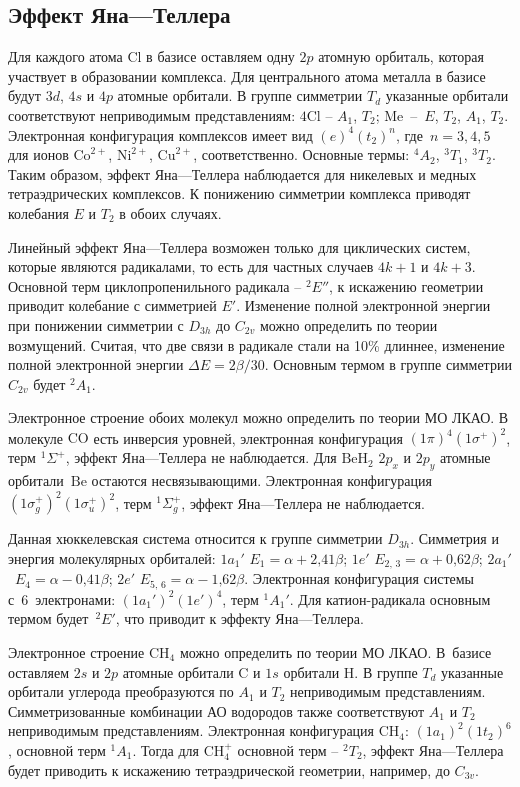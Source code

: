 \subsection{Эффект Яна—Теллера}
 Для каждого атома Cl в базисе оставляем одну $2p$ атомную орбиталь, которая участвует в образовании комплекса. Для центрального атома металла в базисе будут $3d$, $4s$ и $4p$ атомные орбитали. В группе симметрии $T_d$ указанные орбитали соответствуют неприводимым представлениям: $\text{4Cl}$ – $A_1$, $T_2$; $\text{Me}$~–~$E$, $T_2$, $A_1$, $T_2$. Электронная конфигурация комплексов имеет вид $(e)^4(t_2)^n$, где~$n = 3\text{,}\,4\text{,}\,5$ для ионов $\text{Co}^{2+}$, $\text{Ni}^{2+}$, $\text{Cu}^{2+}$, соответственно. Основные термы: $^4A_2$, $^3T_1$, $^3T_2$. Таким образом, эффект Яна—Теллера наблюдается для никелевых и медных тетраэдрических комплексов. К понижению симметрии комплекса приводят колебания $E$ и $T_2$ в обоих случаях.\par
{} Линейный эффект Яна—Теллера возможен только для циклических систем, которые являются радикалами, то есть для частных случаев $4k + 1$ и $4k + 3$. Основной терм циклопропенильного радикала – $^2E''$, к искажению геометрии приводит колебание с симметрией $E'$. Изменение полной электронной энергии при понижении симметрии с $D_{3h}$ до $C_{2v}$ можно определить по теории возмущений. Считая, что две связи в радикале стали на 10\% длиннее, изменение полной электронной энергии $\Delta E = 2\beta / 30$. Основным термом в группе симметрии $C_{2v}$ будет $^2A_1$.\par
{} Электронное строение обоих молекул можно определить по теории МО ЛКАО. В молекуле $\text{CO}$ есть инверсия уровней, электронная конфигурация $(1\pi)^4(1\sigma^+)^2$, терм $^1\Sigma^+$, эффект Яна—Теллера не наблюдается. Для $\text{BeH}_2$ $2p_x$ и $2p_y$ атомные орбитали~$\text{Be}$ остаются несвязывающими. Электронная конфигурация $(1\sigma^+_g)^2(1\sigma^+_u)^2$, терм $^1\Sigma^+_g$, эффект Яна—Теллера не наблюдается.\par
{} Данная хюккелевская система относится к группе симметрии $D_{3h}$. Симметрия и энергия молекулярных орбиталей: $1a_{1}'$ $E_1=\alpha + 2\text{,}41\beta$; $1e'$ $E_{2,\,3}=\alpha+ 0\text{,}62 \beta$; $2a_{1}'$~$E_4=\alpha- 0\text{,}41 \beta$; $2e'$ $E_{5,\,6}=\alpha - 1\text{,}62 \beta$. Электронная конфигурация системы с~6~электронами: $(1a_1')^2(1e')^4$, терм $^1A_1'$. Для катион-радикала основным термом будет~$^2E'$, что приводит к эффекту Яна—Теллера.\par
{} Электронное строение $\text{CH}_4$ можно определить по теории МО ЛКАО. В~базисе оставляем $2s$ и $2p$ атомные орбитали C и $1s$ орбитали H. В группе $T_d$ указанные орбитали углерода преобразуются по $A_1$ и $T_2$ неприводимым представлениям. Симметризованные комбинации АО водородов также соответствуют $A_1$ и $T_2$ неприводимым представлениям. Электронная конфигурация $\text{CH}_4$: $(1a_1)^2(1t_2)^6$, основной терм $^1A_1$. Тогда для $\text{CH}_4^+$ основной терм – $^2T_2$, эффект Яна—Теллера будет приводить к искажению тетраэдрической геометрии, например, до $C_{3v}$.\par

